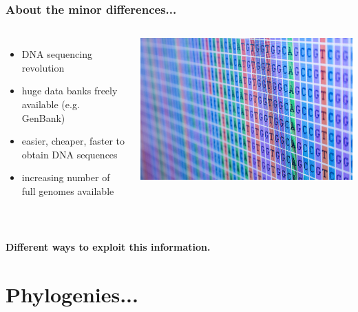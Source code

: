 \documentclass[Xcolor=svgnames,mathserif]{beamer}
\begin{document}
\begin{frame}
  \frametitle{About the minor differences...}

\begin{columns}[c]
\begin{itemize}
\item DNA sequencing revolution
\item huge data banks freely available (e.g. GenBank)
\item easier, cheaper, faster to obtain DNA sequences
\item increasing number of full genomes available
\end{itemize}
	\includegraphics[width=\textwidth]{figs/DNAsequences}\\
	\end{columns}
~\\
\vspace{1cm}
\centering
\pause
\textbf{Different ways to exploit this information.}

\end{frame}





\section{Phylogenies...}
\subsection{~}
\end{document}
